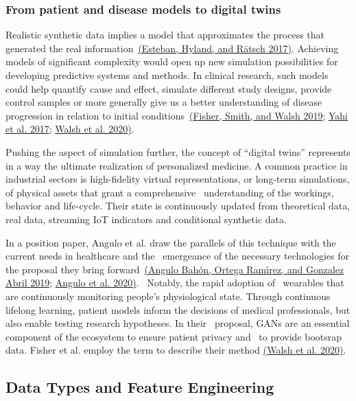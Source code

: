 \documentclass[10pt]{article}
\begin{document}
\subsubsection{From patient and disease models to digital
twins}

{\label{415935}}

Realistic synthetic data implies a model that approximates the process
that generated the real information~\hyperref[csl:5]{(Esteban, Hyland, and R{\"a}tsch 2017)}. Achieving models
of significant complexity would open up new simulation possibilities for
developing predictive systems and methods. In clinical research, such
models could help quantify cause and effect, simulate different study
designs, provide control samples or more generally give us a better
understanding of disease progression in relation to initial
conditions~\hyperref[csl:10]{(Fisher, Smith, and Walsh 2019}; \hyperref[csl:6]{Yahi et al. 2017}; \hyperref[csl:12]{Walsh et al. 2020)}.~

Pushing the aspect of simulation further, the concept of ``digital
twins'' represents in a way the ultimate realization of personalized
medicine. A common practice in industrial sectors is high-fidelity
virtual representations, or long-term simulations, of physical assets
that grant a comprehensive~ understanding of the workings, behavior and
life-cycle. Their state is continuously updated from theoretical data,
real data, streaming IoT indicators and conditional synthetic data.~

In a position paper, Angulo et al. draw the parallels of this technique
with the current needs in healthcare and the~ emergeance of the
necessary technologies for the proposal they bring
forward~\hyperref[csl:40]{(Angulo Bah{\'o}n, Ortega Ram{\'\i}rez, and Gonzalez Abril 2019}; \hyperref[csl:41]{Angulo et al. 2020)}.~ Notably, the rapid adoption of~ wearables
that are continuously monitoring people's physiological state. Through
continuous lifelong learning, patient models inform the decisions of
medical professionals, but also enable testing research hypotheses. In
their~ proposal, GANs are an essential component of the ecosystem to
ensure patient privacy and~ to provide bootsrap data. Fisher et al.
employ the term to describe their method \hyperref[csl:12]{(Walsh et al. 2020)}.

\subsection{Data Types and Feature
Engineering}
\end{document}
